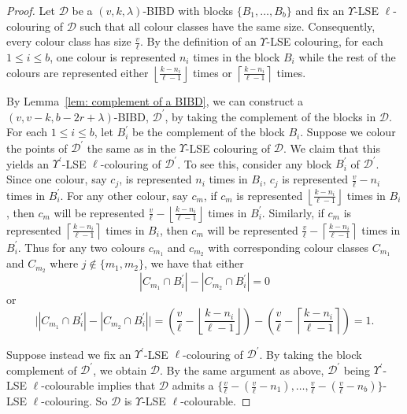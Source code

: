 \documentclass[12pt]{article}
\theoremstyle{definition}
\newcommand{\deviations}{\Upsilon}
\begin{document}
\begin{proof}
    Let $\mathcal{D}$ be a $(v,k,\lambda)$-BIBD with blocks $\{B_1, \dots, B_b\}$ and fix an $\deviations$-LSE $\ell$-colouring of $\mathcal{D}$ such that all colour classes have the same size. Consequently, every colour class has size $\frac{v}{\ell}$. By the definition of an $\deviations$-LSE colouring, for each $1\leq i\leq b$, one colour is represented $n_i$ times in the block $B_i$ while the rest of the colours are represented either $\left\lfloor \frac{k-n_i}{\ell -1}\right\rfloor$ times or $\left\lceil \frac{k-n_i}{\ell -1}\right\rceil$ times. 

    By Lemma~\ref{lem: complement of a BIBD}, we can construct a $(v, v-k, b-2r+\lambda)$-BIBD, $\mathcal{D}^\prime$, by taking the complement of the blocks in $\mathcal{D}$. For each $1\leq i\leq b$, let $B_i^\prime$ be the complement of the block $B_i$. Suppose we colour the points of $\mathcal{D}^\prime$ the same as in the $\deviations$-LSE colouring of $\mathcal{D}$. We claim that this yields an $\deviations^\prime$-LSE $\ell$-colouring of $\mathcal{D}^\prime$. To see this, consider any block $B^\prime_i$ of $\mathcal{D}^\prime$. Since one colour, say $c_j$, is represented $n_i$ times in $B_i$, $c_j$ is represented $\frac{v}{\ell}-n_i$ times in $B_i^\prime$. For any other colour, say $c_m$, if $c_m$ is represented $\left\lfloor \frac{k-n_i}{\ell -1}\right\rfloor$ times in $B_i$, then $c_m$ will be represented $\frac{v}{\ell} - \left\lfloor \frac{k-n_i}{\ell -1}\right\rfloor$ times in $B^\prime_i$. Similarly, if $c_m$ is represented $\left\lceil \frac{k-n_i}{\ell -1}\right\rceil$ times in $B_i$, then $c_m$ will be represented $\frac{v}{\ell} - \left\lceil \frac{k-n_i}{\ell -1}\right\rceil$ times in $B^\prime_i$. Thus for any two colours $c_{m_1}$ and $c_{m_2}$ with corresponding colour classes $C_{m_1}$ and $C_{m_2}$ where $j\notin \{m_1, m_2\}$, we have that either \[|C_{m_1} \cap B^\prime_i| - |C_{m_2} \cap B^\prime_i| = 0\] or \[ \big||C_{m_1} \cap B^\prime_i| - |C_{m_2} \cap B^\prime_i|\big| = \left(\frac{v}{\ell} - \left\lfloor \frac{k-n_i}{\ell -1}\right\rfloor\right) - \left(\frac{v}{\ell} - \left\lceil \frac{k-n_i}{\ell -1}\right\rceil \right) = 1.\] 

    Suppose instead we fix an $\deviations^\prime$-LSE $\ell$-colouring of $\mathcal{D}^\prime$. By taking the block complement of $\mathcal{D}^\prime$, we obtain $\mathcal{D}$. By the same argument as above, $\mathcal{D}^\prime$ being $\deviations^\prime$-LSE $\ell$-colourable implies that $\mathcal{D}$ admits a $\{\frac{v}{\ell} - (\frac{v}{\ell}-n_1), \dots, \frac{v}{\ell}-(\frac{v}{\ell}-n_b)\}$-LSE $\ell$-colouring. So $\mathcal{D}$ is $\deviations$-LSE $\ell$-colourable. 
\end{proof}
\end{document}
